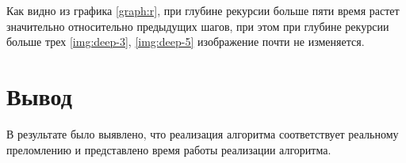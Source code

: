 \newpage

Как видно из графика \ref{graph:r}, при глубине рекурсии больше пяти время растет значительно относительно предыдущих шагов, при этом при глубине рекурсии больше трех \ref{img:deep-3}, \ref{img:deep-5} изображение почти не изменяется. 

\section{Вывод}

В результате было выявлено, что реализация алгоритма соответствует реальному преломлению и представлено время работы реализации алгоритма.